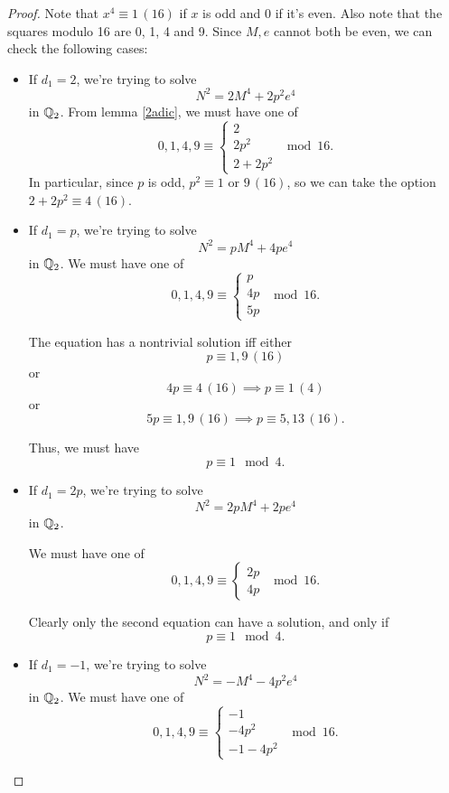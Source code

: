 \documentclass[12pt, a4paper]{amsart}
\begin{document}
\begin{proof}
  Note that $x^4 \equiv 1 \, (16)$ if $x$ is odd and 0 if it's even. Also
  note that the squares modulo 16 are 0, 1, 4 and 9. Since
  $M, e$ cannot both be even, we can check the following cases:
  \begin{itemize}
  \item If $d_1 = 2$, we're trying to solve
    \[N^2 = 2M^4 + 2p^2e^4 \] in ${\mathbb Q}_2$.
    From lemma \autoref{2adic}, we must have one of
    \[0, 1, 4, 9 \equiv
      \begin{cases}
        2 \\
        2p^2 \\
        2+2p^2
      \end{cases} \mod{16}.
    \]
    In particular, since $p$ is odd, $p^2 \equiv 1$ or $9 \, (16)$, so we can
    take the option $2+2p^2 \equiv 4 \, (16)$.

    \item If $d_1 = p$, we're trying to solve
    \[N^2 = pM^4 + 4pe^4 \] in ${\mathbb Q}_2$. 
    We must have one of
    \[0, 1, 4, 9 \equiv
      \begin{cases}
        p \\
        4p \\
        5p
      \end{cases} \mod{16}.
    \]

    The equation has a nontrivial solution iff either
    \[p \equiv 1,9 \, (16)\]
    or
    \[4p \equiv 4 \, (16) \implies p \equiv 1 \, (4)\]
    or
    \[5p \equiv 1, 9 \, (16) \implies p \equiv 5, 13 \, (16). \] 
    
    Thus, we must have
    \[p \equiv 1 \mod{4}.\]
    
    \item If $d_1 = 2p$, we're trying to solve
      \[N^2 = 2pM^4 + 2pe^4 \] in ${\mathbb Q}_2$.
      
    We must have one of
    \[0, 1, 4, 9 \equiv
      \begin{cases}
        2p \\
        4p
      \end{cases} \mod{16}.
    \]

    Clearly only the second equation can have a solution, and only if
    \[p \equiv 1 \mod{4}.\]

    \item If $d_1 = -1$, we're trying to solve
    \[N^2 = -M^4 - 4p^2e^4 \] in ${\mathbb Q}_2$. 
    We must have one of
    \[0, 1, 4, 9 \equiv
      \begin{cases}
        -1 \\
        -4p^2 \\
        -1-4p^2
      \end{cases} \mod{16}.
    \]


\end{itemize}
\end{proof}
\end{document}
